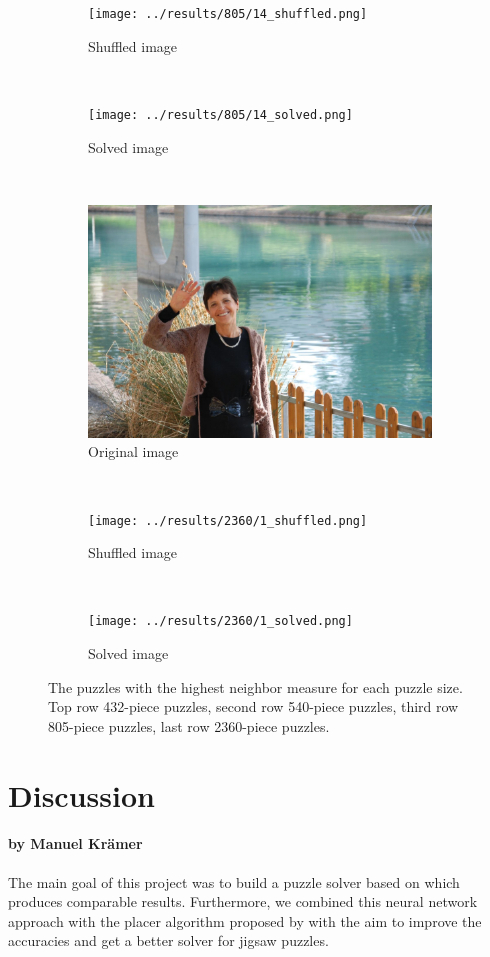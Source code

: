\documentclass[11pt]{report}
\begin{document}
\begin{figure}
\begin{subfigure}[b]{0.3\textwidth}
		\texttt{[image: ../results/805/14\_shuffled.png]}
		\caption{Shuffled image}
	\end{subfigure}
	~
	\begin{subfigure}[b]{0.3\textwidth}
		\texttt{[image: ../results/805/14\_solved.png]}
		\caption{Solved image}
	\end{subfigure}
   ~
  \begin{subfigure}[b]{0.3\textwidth}
		\includegraphics[width=\textwidth]{../imData/2360/1.jpg}
		\caption{Original image}
	\end{subfigure}
	~
	\begin{subfigure}[b]{0.3\textwidth}
		\texttt{[image: ../results/2360/1\_shuffled.png]}
		\caption{Shuffled image}
	\end{subfigure}
	~
	\begin{subfigure}[b]{0.3\textwidth}
		\texttt{[image: ../results/2360/1\_solved.png]}
		\caption{Solved image}
	\end{subfigure}
	\caption{The puzzles with the highest neighbor measure for each puzzle size.
    Top row 432-piece puzzles, second row 540-piece puzzles, third row 805-piece
    puzzles, last row 2360-piece puzzles.}
	\label{fig:neighborMeasure}
\end{figure}

\chapter{Discussion}
\subsubsection*{by Manuel Krämer}

The main goal of this project was to build a puzzle solver based on \cite{sholomon2016dnn} which produces comparable results. Furthermore, we combined this neural network approach with the placer algorithm proposed by \cite{Paikin2015} with the aim to improve the accuracies and get a better solver for jigsaw puzzles.
\end{document}

